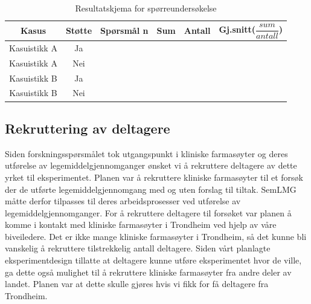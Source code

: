 \begin{description}
\begin{table}[H]
    \centering
    \begin{tabular}{|c|c|c|c|c|c|} 
 \hline
 \textbf{Kasus} & \textbf{Støtte} & \textbf{Spørsmål n} & Sum & Antall & Gj.snitt($\dfrac{sum}{antall}$)\\
 \hline
 Kasuistikk A & Ja &  &  & &    \\ 
 \hline
 Kasuistikk A & Nei &  &  & &    \\
 \hline
 Kasuistikk B & Ja &  &  &   &\\
 \hline
 Kasuistikk B & Nei &  &  &   &\\
 \hline
\end{tabular}
\caption{Resultatskjema for spørreundersøkelse}
\label{tab:ressporsmalskjema}
\end{table}

\end{description}

\subsection{Rekruttering av deltagere}
Siden forskningsspørsmålet tok utgangspunkt i kliniske farmasøyter og deres utførelse av legemiddelgjennomganger ønsket vi å rekruttere deltagere av dette yrket til eksperimentet. Planen var å rekruttere kliniske farmasøyter til et forsøk der de utførte legemiddelgjennomgang med og uten forslag til tiltak. SemLMG måtte derfor tilpasses til deres arbeidsprosesser ved utførelse av legemiddelgjennomganger. For å rekruttere deltagere til forsøket var planen å komme i kontakt med kliniske farmasøyter i Trondheim ved hjelp av våre biveiledere. Det er ikke mange kliniske farmasøyter i Trondheim, så det kunne bli vanskelig å rekruttere tilstrekkelig antall deltagere. Siden vårt planlagte eksperimentdesign tillatte at deltagere kunne utføre eksperimentet hvor de ville, ga dette også mulighet til å rekruttere kliniske farmasøyter fra andre deler av landet. Planen var at dette skulle gjøres hvis vi fikk for få deltagere fra Trondheim. 






